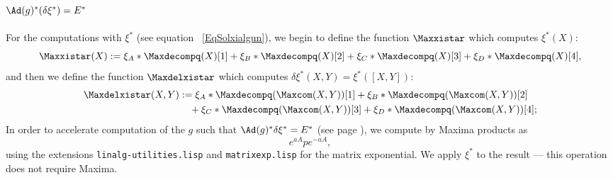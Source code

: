 \subsection{\texorpdfstring{$\Ad(g)^*(\delta\xi^*)=E^*$}{AdgxiE}}

For the computations with $\xi^*$ (see equation ~\ref{EqSolxialgun}), we begin to define the function $\Maxxistar$ which computes $\xi^*(X)$:
\[
\Maxxistar(X):=\xi_{A}*\Maxdecompq(X)[1]+\xi_{B}*\Maxdecompq(X)[2]+\xi_{C}*\Maxdecompq(X)[3]+\xi_{D}*\Maxdecompq(X)[4],
\]
and then we define the function $\Maxdelxistar$ which computes $\delta\xi^*(X,Y)=\xi^*([X,Y])$:
\[
\begin{split}
\Maxdelxistar(X,Y)&:=\xi_{A}*\Maxdecompq(\Maxcom(X,Y))[1]+\xi_{B}*\Maxdecompq(\Maxcom(X,Y))[2]\\
	&\quad+\xi_{C}*\Maxdecompq(\Maxcom(X,Y))[3]+\xi_{D}*\Maxdecompq(\Maxcom(X,Y))[4];
\end{split}
\]
In order to accelerate computation of  the $g$ such that $\Ad(g)^*\delta\xi^*=E^*$ (see page \pageref{PgAdgXEbbekl}), we compute by Maxima products as
\[
   e^{aA}p e^{-aA},
\]
using the extensions \texttt{linalg-utilities.lisp} and \texttt{matrixexp.lisp} for the matrix exponential. We apply $\xi^*$ to the result --- this operation does not require Maxima.
